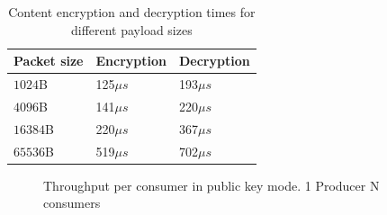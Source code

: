 \begin{table}[!h]
\centering
\caption{Content encryption and decryption times for different payload sizes}
\label{my-label}
\begin{tabular}{|l|l|l|}
\hline
Packet size        & Encryption & Decryption \\ \hline
$1024$B & 125$\mu s$        & 193$\mu s$        \\ \hline
$4096$B & 141$\mu s$        & 220$\mu s$        \\ \hline
$16384$B & 220$\mu s$        & 367$\mu s$        \\ \hline
$65536$B & 519$\mu s$        & 702$\mu s$        \\ \hline
\end{tabular}
\end{table}

\begin{figure}[!t]
\centering
  \hfil
  \hfil
  \hfil
\caption{Throughput per consumer in public key mode. 1 Producer N consumers}\label{exp1}
\end{figure}


